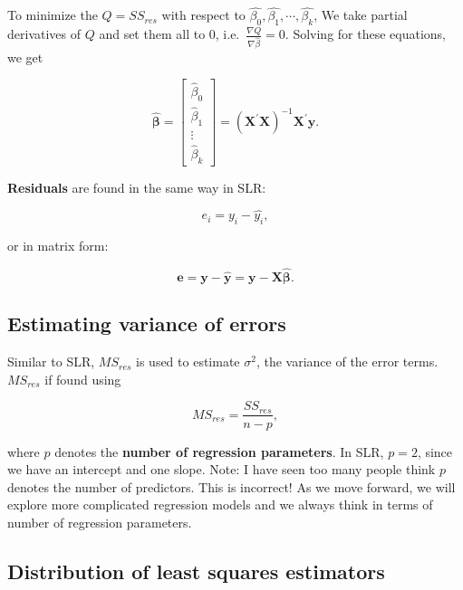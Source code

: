 \documentclass[
]{book}
\begin{document}
To minimize the \(Q = SS_{res}\) with respect to \(\hat{\beta_0}, \hat{\beta_1}, \cdots, \hat{\beta_k}\), We take partial derivatives of \(Q\) and set them all to 0, i.e.~\(\frac{\nabla Q}{\nabla \hat{\beta}}=0\). Solving for these equations, we get

\begin{equation} 
\boldsymbol{\hat{\beta}} = \left[
\begin{array}{c}
   \hat{\beta}_0  \\
   \hat{\beta}_1 \\
   \vdots \\
   \hat{\beta}_k
\end{array}
\right]  =
\left(\boldsymbol{X}^{\prime} \boldsymbol{X} \right)^{-1} \boldsymbol{X}^{\prime} \boldsymbol{y} .
\label{eq:6b}
\end{equation}

\textbf{Residuals} are found in the same way in SLR:

\[
e_i = y_i - \hat{y_i},
\]

or in matrix form:

\begin{equation} 
\boldsymbol{e} = \boldsymbol{y} - \boldsymbol{\hat{y}} = \boldsymbol{y} - \boldsymbol{X\hat{\beta}}.
\label{eq:6res}
\end{equation}

\hypertarget{estimating-variance-of-errors}{%
\subsection{Estimating variance of errors}\label{estimating-variance-of-errors}}

Similar to SLR, \(MS_{res}\) is used to estimate \(\sigma^2\), the variance of the error terms. \(MS_{res}\) if found using

\begin{equation}
MS_{res}=\frac{SS_{res}}{n-p},
\label{eq:6MSres}
\end{equation}

where \(p\) denotes the \textbf{number of regression parameters}. In SLR, \(p=2\), since we have an intercept and one slope. Note: I have seen too many people think \(p\) denotes the number of predictors. This is incorrect! As we move forward, we will explore more complicated regression models and we always think in terms of number of regression parameters.

\hypertarget{distribution-of-least-squares-estimators-1}{%
\subsection{Distribution of least squares estimators}\label{distribution-of-least-squares-estimators-1}}
\end{document}
